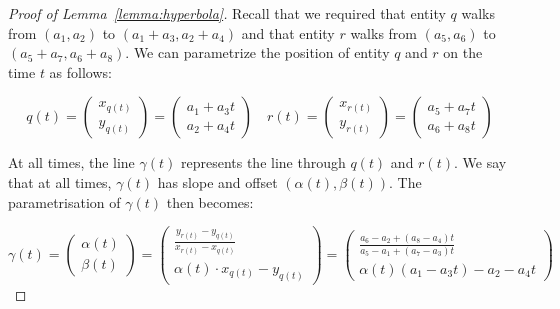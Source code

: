 \documentclass[a4paper, UKenglish]{paper}
\begin{document}
\begin{proof}[Proof of Lemma~\ref{lemma:hyperbola}]
Recall that we required that entity $q$ walks from $(a_1, a_2)$ to $(a_1 + a_3, a_2 + a_4)$ and that entity $r$ walks from $(a_5, a_6)$ to $(a_5 + a_7, a_6 + a_8)$. We can parametrize the position of entity $q$ and $r$ on the time $t$ as follows:

\begin{equation}
    \label{eq:line}
     q(t) = \left( \begin{array}{c}
         x_{q(t)}  \\
         y_{q(t)} 
    \end{array}  \right) = 
    \left( \begin{array}{c}
         a_1 + a_3 t \\
         a_2 + a_4 t
    \end{array}  \right)  \quad
      r(t) = \left( \begin{array}{c}
         x_{r(t)}  \\
         y_{r(t)} 
    \end{array}  \right) = 
    \left( \begin{array}{c}
         a_5 + a_7 t \\
         a_6 + a_8 t
    \end{array}  \right) 
\end{equation}


At all times, the line $\gamma(t)$ represents the line through $q(t)$ and $r(t)$. We say that at all times, $\gamma(t)$ has slope and offset $(\alpha(t), \beta(t))$. The parametrisation of $\gamma(t)$ then becomes:

\begin{equation}
\label{eq:curve}
   \gamma(t) = \left( \begin{array}{c}
         \alpha(t)  \\
         \beta(t) 
    \end{array}  \right) = 
    \left( \begin{array}{c}
         \frac{y_{r(t)} - y_{q(t)}}{x_{r(t)} - x_{q(t)}}  \\
         \alpha(t)\cdot x_{q(t)} - y_{q(t)}
    \end{array}  \right) =
    \left( \begin{array}{c}
         \frac{ a_6 - a_2 + (a_8 - a_4) t}
      { a_5 - a_1  + (a_7 - a_3) t }  \\
         \alpha(t) (a_1 - a_3 t) - a_2 - a_4 t 
    \end{array}  \right)
  \end{equation}
  

\end{proof}
\end{document}
